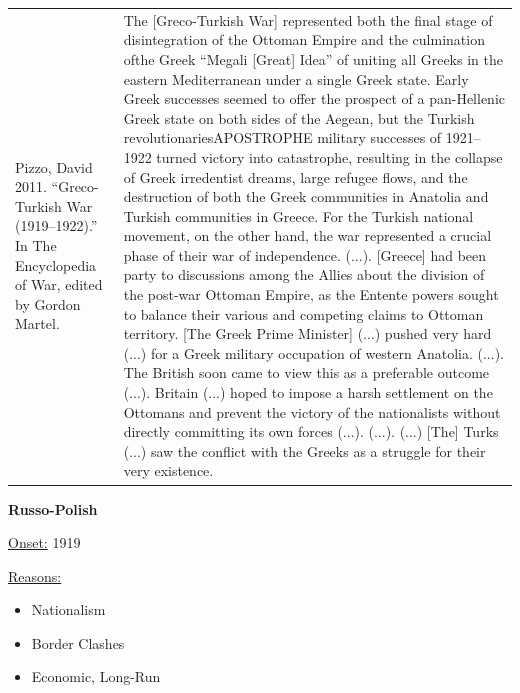 {\begin{longtable}{p{}p{}}
\\
Pizzo, David 2011. “Greco-Turkish War (1919–1922).” In The Encyclopedia of War, edited by Gordon Martel. & The [Greco-Turkish War] represented both the final stage of disintegration of the Ottoman Empire and the culmination ofthe Greek “Megali [Great] Idea” of uniting all Greeks in the eastern Mediterranean under a single Greek state. Early Greek successes seemed to offer the prospect of a pan-Hellenic Greek state on both sides of the Aegean, but the Turkish revolutionariesAPOSTROPHE military successes of 1921–1922 turned victory into catastrophe, resulting in the collapse of Greek irredentist dreams, large refugee flows, and the destruction of both the Greek communities in Anatolia and Turkish communities in Greece. For the Turkish national movement, on the other hand, the war represented a crucial phase of their war of independence. (...).
[Greece] had been party to discussions among the Allies about the division of the post-war Ottoman Empire, as the Entente powers sought to balance their various and competing claims to Ottoman territory. [The Greek Prime Minister] (...) pushed very hard (...) for a Greek military occupation of western Anatolia. (...). The British soon came to view this as a preferable outcome (...). Britain (...) hoped to impose a harsh settlement on the Ottomans and prevent the victory of the nationalists without directly committing its own forces (...). (...). (...) [The] Turks (...) saw the conflict with the Greeks as a struggle for their very existence.
\\
\end{longtable}}
\clearpage
         \textbf{Russo-Polish} 

          \underline{Onset:} 1919         

\underline{Reasons:}
\begin{itemize}
\item Nationalism
\item Border Clashes
\item Economic, Long-Run
\end{itemize}

